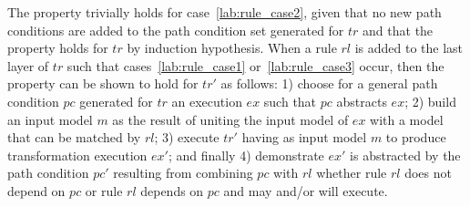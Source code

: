 \begin{ps}
\begin{itemize}
The property trivially holds for case~\ref{lab:rule_case2}, given that no new path conditions are added to the path condition set generated for $tr$ and that the property holds for $tr$ by induction hypothesis. When a rule $rl$ is added to the last layer of $tr$ such that cases~\ref{lab:rule_case1} or~\ref{lab:rule_case3} occur, then the property can be shown to hold for $tr'$ as follows: 1) choose for a general path condition $pc$ generated for $tr$ an execution $ex$ such that $pc$ abstracts $ex$; 2) build an input model $m$ as the result of uniting the input model of $ex$ with a model that can be matched by $rl$; 3) execute $tr'$ having as input model $m$ to produce transformation execution $ex'$; and finally 4) demonstrate $ex'$ is abstracted by the path condition $pc'$ resulting from combining $pc$ with $rl$ whether rule $rl$ does not depend on $pc$ or rule $rl$ depends on $pc$ and may and/or will execute.
\end{itemize}
\end{ps} 


